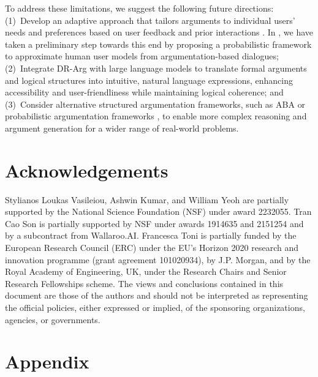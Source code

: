 \documentclass{article}
\begin{document}
To address these limitations, we suggest the following future directions: (1)~Develop an adaptive approach that tailors arguments to individual users' needs and preferences based on user feedback and prior interactions \cite{sreedharan2021using,vasileioua2023please}. In \citet{tang2024approximating}, we have taken a preliminary step towards this end by proposing a probabilistic framework to approximate human user models from argumentation-based dialogues; (2)~Integrate DR-Arg with large language models \cite{brown2020language} to translate formal arguments and logical structures into intuitive, natural language expressions, enhancing accessibility and user-friendliness while maintaining logical coherence; and (3)~Consider alternative structured argumentation frameworks, such as ABA \cite{bondarenko1997abstract,vcyras2016aba+} or probabilistic argumentation frameworks \cite{kohlas2003probabilistic,hunter2013probabilistic}, to enable more complex reasoning and argument generation for a wider range of real-world problems.



\section*{Acknowledgements}

Stylianos Loukas Vasileiou, Ashwin Kumar, and William Yeoh are partially supported by the National Science Foundation (NSF) under award 2232055. Tran Cao Son is partially supported by NSF under awards 1914635 and 2151254 and by a subcontract from Wallaroo.AI. Francesca Toni is partially funded by the European Research Council (ERC) under the EU's Horizon 2020 research and innovation programme (grant agreement 101020934), by J.P. Morgan, and by the
Royal Academy of Engineering, UK, under the Research Chairs and Senior Research Fellowships scheme. The views and conclusions contained in this document are those of the authors and should not be interpreted as representing the official policies, either expressed or implied, of the sponsoring organizations, agencies, or governments.








\newpage

\section*{Appendix}
\end{document}

